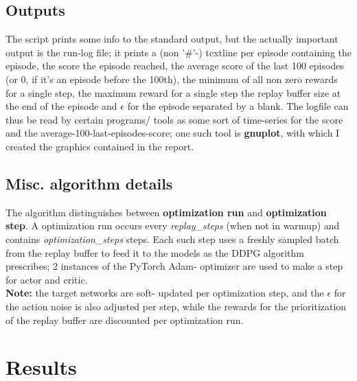 \documentclass[a4paper]{article}
\begin{document}
\subsection{Outputs}

The script prints some info to the standard output, but the actually important
output is the run-log file; it prints a (non '\#'-) textline per episode containing
the episode, the score the episode reached, the average score of the last 100
episodes (or 0, if it's an episode before the 100th), the minimum of all
non zero rewards for a single step, the maximum reward for a single step
the replay buffer size at the end of the episode and $\epsilon$ for the episode
separated by a blank.
The logfile can thus be read by certain programs/ tools as some sort
of time-series for the score and the average-100-last-episodes-score; one such
tool is \textbf{gnuplot}, with which I created the graphics contained in the report.

\subsection{Misc. algorithm details}
The algorithm distinguishes between \textbf{optimization run} and \textbf{optimization step}.
A optimization run occurs every \textit{replay\_steps} (when not in warmup) and
contains \textit{optimization\_steps} steps. Each such step uses a freshly sampled
batch from the replay buffer to feed it to the models as the DDPG algorithm
prescribes; 2 instances of the PyTorch Adam- optimizer are used to make a step
for actor and critic.
\\
\textbf{Note:} the target networks are soft- updated per optimization step,
and the $\epsilon$ for the action noise is also adjusted per step, while
the rewards for the prioritization of the replay buffer are discounted per
optimization run.

\section{Results}
\end{document}
